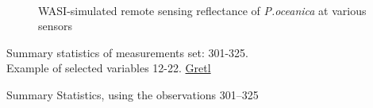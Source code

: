\documentclass[11pt]{article}
\begin{document}
\begin{appendices}
\begin{figure}[H]
	\centering
	\\
	\caption{WASI-simulated remote sensing reflectance of \textit{P.oceanica} at various sensors}
	\label{fig:4.6W}
\end{figure}

\begin{table}[H]
	\begin{center}
		\caption{Summary statistics of measurements set: 301-325. \\ Example of selected variables 12-22. \href{http://gretl.sourceforge.net/}{Gretl}­}\label{tab:16}
		Summary Statistics, using the observations 301--325\\
	

\end{center}
\end{table}
\end{appendices}
\end{document}
